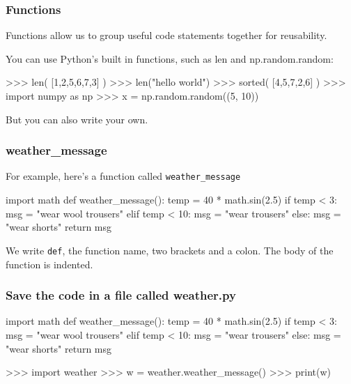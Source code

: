 \documentclass{beamer}
\begin{document}

\begin{frame}
\frametitle{CS24420 \& MA25220 \& MT25220 \& MX35220 \& CSM0120}}

\begin{center}
\begin{huge}
Lecture 8: Hands-on Using functions 
\end{huge}
\bigskip

Amanda Clare (afc@aber.ac.uk)

\end{center}
\end{frame}


\begin{frame}[fragile]
\frametitle{Functions}
Functions allow us to group useful code statements
together for reusability.

\bigskip

You can use Python's built in functions, such
as len and np.random.random:
\begin{code}
>>> len( [1,2,5,6,7,3] )
>>> len("hello world")
>>> sorted( [4,5,7,2,6] )
>>> import numpy as np
>>> x = np.random.random((5, 10))
\end{code}
But you can also write your own.
\end{frame}


\begin{frame}[fragile]
\frametitle{weather\_message}
For example, here's a function called \texttt{weather\_message}
\begin{code}
import math
def weather_message():
   temp = 40 * math.sin(2.5)
   if temp < 3:
      msg = "wear wool trousers"
   elif temp < 10:
      msg = "wear trousers"
   else: 
      msg = "wear shorts"
   return msg
\end{code}
\pause
We write \texttt{def}, the function name, two brackets and a
colon.
The body of the function is indented.
\end{frame}

\begin{frame}[fragile]
\frametitle{Save the code in a file called weather.py}
\begin{shaded}
\begin{code}
import math
def weather_message():
   temp = 40 * math.sin(2.5)
   if temp < 3:
      msg = "wear wool trousers"
   elif temp < 10:
      msg = "wear trousers"
   else: 
      msg = "wear shorts"
   return msg
\end{code}
\end{shaded}
\begin{code}
>>> import weather
>>> w = weather.weather_message()
>>> print(w)
\end{code}
\end{frame}
\end{document}
